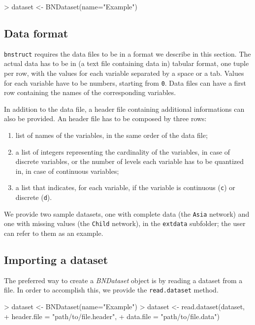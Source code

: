 \documentclass{article}
\newcommand{\Rpackage}[1]{{\texttt{#1}}}
\newcommand{\Rmethod}[1]{{\texttt{#1}}}
\newcommand{\Rclass}[1]{{\textit{#1}}}
\begin{document}
\begin{Schunk}
\begin{Sinput}
> dataset <- BNDataset(name="Example")
\end{Sinput}
\end{Schunk}


\subsection{Data format}
\Rpackage{bnstruct} requires the data files to be in a format we describe in this section. 
The actual data has to be in (a text file containing data in) tabular format, one tuple per row,
with the values for each variable separated by a space or a tab. Values for each variable have to be
numbers, starting from \texttt{0}. Data files can have a first row containing the names of the corresponding variables.

In addition to the data file, a header file containing additional informations can also be provided.
An header file has to be composed by three rows:
\begin{enumerate}
\item list of names of the variables, in the same order of the data file;
\item a list of integers representing the cardinality of the variables, in case of discrete variables,
      or the number of levels each variable has to be quantized in, in case of continuous variables;
\item a list that indicates, for each variable, if the variable is continuous (\texttt{c}) or discrete (\texttt{d}).
\end{enumerate}

We provide two sample datasets, one with complete data (the \texttt{Asia} network) and one with missing values
(the \texttt{Child} network), in the \texttt{extdata} subfolder;
the user can refer to them as an example.

\subsection{Importing a dataset}
The preferred way to create a \Rclass{BNDataset} object is by reading a dataset from a file.
In order to accomplish this, we provide the \Rmethod{read.dataset} method.

\begin{Schunk}
\begin{Sinput}
> dataset <- BNDataset(name="Example")
> dataset <- read.dataset(dataset,
+                         header.file = "path/to/file.header",
+                         data.file   = "path/to/file.data")
\end{Sinput}
\end{Schunk}
\end{document}
